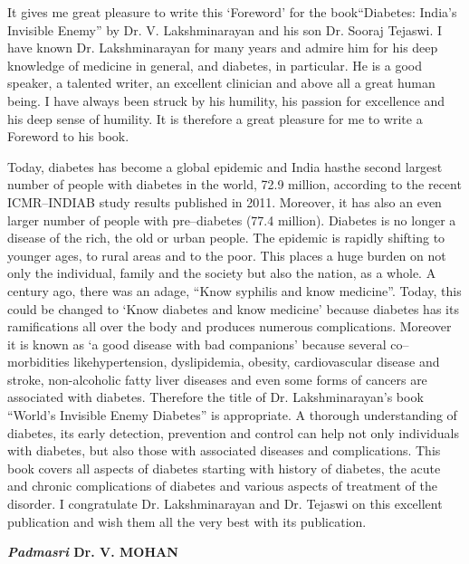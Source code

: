 It gives me great pleasure to write this ‘Foreword’ for the book\break “Diabetes: India's Invisible Enemy” by Dr. V. Lakshminara\-yan and his son Dr. Sooraj Tejaswi. I have known Dr. Lakshminarayan for many years and admire him for his deep knowledge of medicine in general, and diabetes, in particular. He is a good speaker, a talented writer, an excellent clinician and above all a great human being. I have always been struck by his humi\-lity, his passion for excellence and his deep sense of humility. It is therefore a great pleasure for me to write a Foreword to his book.

Today, diabetes has become a global epidemic and India has\break the second largest number of people with diabetes in the world, 72.9 million, according to the recent ICMR–INDIAB study results published in 2011. Moreover, it has also an even larger number of people with pre–diabetes (77.4 million). Diabetes is no longer a disease of the rich, the old or urban people. The epidemic is rapidly shifting to younger ages, to rural areas and to the poor. This places a huge burden on not only the individual, family and the society but also the nation, as a whole. A century ago, there was an adage, “Know syphilis and know medicine”. Today, this could be changed to ‘Know diabetes and know medicine’ because diabetes has its ramifications all over the body and produces numerous complications. Moreover it is known as ‘a good di\-sease with bad companions’ because several co–morbidities like\break hypertension, dyslipidemia, obesity, cardiovascular disease and stroke, non-alcoholic fatty liver diseases and even some forms of cancers are associated with diabetes. Therefore the title of Dr. Lakshminarayan’s book “World's Invisible Enemy Diabetes” is appropriate. A thorough understanding of diabetes, its early detection, prevention and control can help not only individuals with diabetes, but also those with associated diseases and compli\-cations. This book covers all aspects of diabetes starting with history of diabetes, the acute and chronic complications of diabetes and various aspects of treatment of the disorder. I congra\-tulate Dr. Lakshminarayan and Dr. Tejaswi on this exce\-llent publication and wish them all the very best with its publication.

\begin{flushright}
\textbf{\textit{Padmasri} Dr. V. MOHAN}
\end{flushright}

